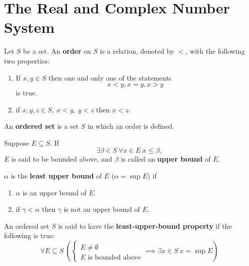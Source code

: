 \section{The Real and Complex Number System}
    \begin{defi}
        Let $S$ be a set. An \textbf{order} on $S$ is a relation, denoted by $<$, with the following two properties:
        \begin{enumerate}
            \item If $x, y \in S$ then one and only one of the statements
            \begin{equation}
                x < y, x = y, x > y
            \end{equation}
            is true.
            \item if $x,y,z \in S, \ x < y, \ y < z$ then $x < z$.
        \end{enumerate}
    \end{defi} 

    \begin{defi}
        An \textbf{ordered set} is a set $S$ in which an order is defined.
    \end{defi}
    \begin{defi}
        Suppose $E \subseteq S$. If
        \begin{equation}
            \exists \beta \in S \ \forall x \in E \ x \leq \beta ,
        \end{equation}
        $E$ is said to be bounded above, and $\beta$ is called an \textbf{upper bound} of $E$.
    \end{defi}
    \begin{defi}
        $\alpha$ is the \textbf{least upper bound} of $E$ ($\alpha = \sup E$) if
        \begin{enumerate}
            \item $\alpha$ is an upper bound of $E$.
            \item if $\gamma < \alpha$ then $\gamma$ is not an upper bound of $E$.
        \end{enumerate}
    \end{defi}
    \begin{defi}
        An ordered set $S$ is said to have the \textbf{least-upper-bound property} if the following is true:
        \begin{equation*}
            \forall E \subseteq S \ \left(
                \begin{cases}
                    E \neq \emptyset \\
                    E \text{ is bounded above}
                \end{cases}
                \implies \exists x \in S \ x = \sup E
            \right)
        \end{equation*}
    \end{defi}

